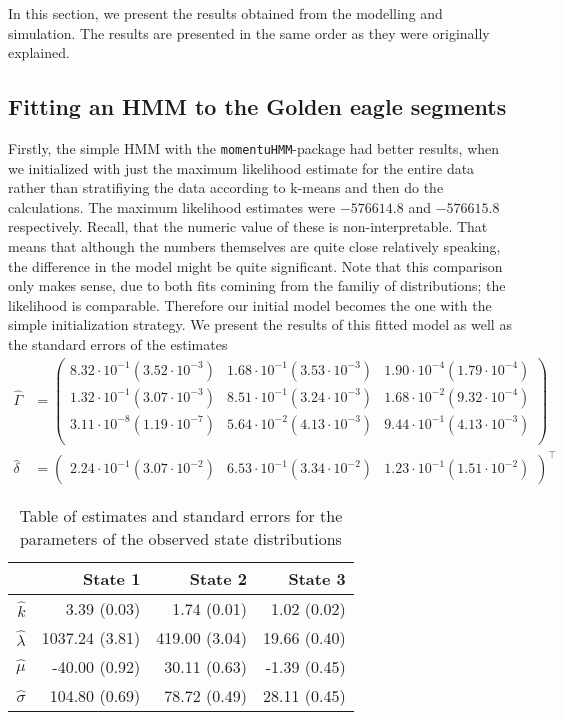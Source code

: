 In this section, we present the results obtained from the modelling and simulation. The results are presented in the same order as they were originally explained.
\subsection{Fitting an HMM to the Golden eagle segments}
Firstly, the simple HMM with the \texttt{momentuHMM}-package had better results, when we initialized with just the maximum likelihood estimate for the entire data rather than stratifiying the data according to k-means and then do the calculations. The maximum likelihood estimates were $-576614.8$ and $-576615.8$ respectively. Recall, that the numeric value of these is non-interpretable. That means that although the numbers themselves are quite close relatively speaking, the difference in the model might be quite significant. Note that this comparison only makes sense, due to both fits comining from the familiy of distributions; the likelihood is comparable. Therefore our initial model becomes the one with the simple initialization strategy. We present the results of this fitted model as well as the standard errors of the estimates
\begin{align}
    \hat{\Gamma} &= \begin{pmatrix}
    8.32 \cdot 10^{-1} (3.52 \cdot 10^{-3}) & 1.68 \cdot 10^{-1} (3.53 \cdot 10^{-3}) & 1.90 \cdot 10^{-4} (1.79 \cdot 10^{-4})\\
    1.32 \cdot 10^{-1} (3.07 \cdot 10^{-3}) & 8.51 \cdot 10^{-1} (3.24 \cdot 10^{-3}) & 1.68 \cdot 10^{-2} (9.32 \cdot 10^{-4})\\
    3.11 \cdot 10^{-8} (1.19 \cdot 10^{-7}) & 5.64 \cdot 10^{-2} (4.13 \cdot 10^{-3}) & 9.44 \cdot 10^{-1} (4.13 \cdot 10^{-3})\\
    \end{pmatrix}\label{gammaMat1}\\
    \hat{\delta} &= \begin{pmatrix}
        2.24 \cdot 10^{-1} (3.07 \cdot 10^{-2}) &
        6.53 \cdot 10^{-1} (3.34 \cdot 10^{-2}) &
        1.23 \cdot 10^{-1} (1.51 \cdot 10^{-2})
    \end{pmatrix}^\top \label{deltaVec1}
    \end{align}
\begin{table}[h]
    \centering
    \begin{tabular}{rrrr}
        \hline
        & \textbf{State 1} & \textbf{State 2} & \textbf{State 3} \\
        \hline
        $\hat{k}$ & 3.39 (0.03) & 1.74 (0.01) & 1.02 (0.02) \\
        $\hat{\lambda}$ & 1037.24 (3.81) & 419.00 (3.04) & 19.66 (0.40) \\
        $\hat{\mu}$ & -40.00 (0.92) & 30.11 (0.63) & -1.39 (0.45) \\ 
        $\hat{\sigma}$ & 104.80 (0.69) & 78.72 (0.49) & 28.11 (0.45) \\ 
        \hline
    \end{tabular}
    \caption{Table of estimates and standard errors for the parameters of the observed state distributions}
    \label{estimParam1}
\end{table}\\
